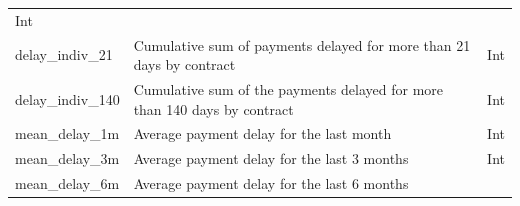 \documentclass[
]{article}
\begin{document}
\begin{longtable}[]{@{}lll@{}}
\begin{minipage}[t]{0.30\columnwidth}
Int\strut
\end{minipage}\tabularnewline
\begin{minipage}[t]{0.30\columnwidth}\raggedright
delay\_indiv\_21\strut
\end{minipage} & \begin{minipage}[t]{0.30\columnwidth}\raggedright
Cumulative sum of payments delayed for more than 21 days by contract\strut
\end{minipage} & \begin{minipage}[t]{0.30\columnwidth}\raggedright
Int\strut
\end{minipage}\tabularnewline
\begin{minipage}[t]{0.30\columnwidth}\raggedright
delay\_indiv\_140\strut
\end{minipage} & \begin{minipage}[t]{0.30\columnwidth}\raggedright
Cumulative sum of the payments delayed for more than 140 days by contract\strut
\end{minipage} & \begin{minipage}[t]{0.30\columnwidth}\raggedright
Int\strut
\end{minipage}\tabularnewline
\begin{minipage}[t]{0.30\columnwidth}\raggedright
mean\_delay\_1m\strut
\end{minipage} & \begin{minipage}[t]{0.30\columnwidth}\raggedright
Average payment delay for the last month\strut
\end{minipage} & \begin{minipage}[t]{0.30\columnwidth}\raggedright
Int\strut
\end{minipage}\tabularnewline
\begin{minipage}[t]{0.30\columnwidth}\raggedright
mean\_delay\_3m\strut
\end{minipage} & \begin{minipage}[t]{0.30\columnwidth}\raggedright
Average payment delay for the last 3 months\strut
\end{minipage} & \begin{minipage}[t]{0.30\columnwidth}\raggedright
Int\strut
\end{minipage}\tabularnewline
\begin{minipage}[t]{0.30\columnwidth}\raggedright
mean\_delay\_6m\strut
\end{minipage} & \begin{minipage}[t]{0.30\columnwidth}\raggedright
Average payment delay for the last 6 months\strut
\end{minipage} & \begin{minipage}[t]{0.30\columnwidth}\raggedright

\end{minipage}
\end{longtable}
\end{document}
